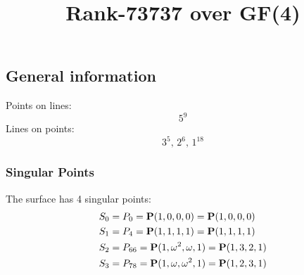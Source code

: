 \documentclass{article}
\newcommand\setTBstruts{\def\T{\rule{0pt}{2.6ex}}%
\def\B{\rule[-1.2ex]{0pt}{0pt}}}
\newcommand{\bP}{{\bf P}}
\begin{document}
 
\setTBstruts



{\allowdisplaybreaks%






\title{Rank-73737 over GF(4)}
\author{}%
\maketitle%
%
{}



\subsection*{General information}
Points on lines:
$$
5^9$$
Lines on points:
$$
3^5,\,2^6,\,1^{18}$$
\subsubsection*{Singular Points}
The surface has 4 singular points:\\
\begin{align*}
S_{0} &= P_{0}=\bP(1, 0, 0, 0) = \bP(1, 0, 0, 0)\\
S_{1} &= P_{4}=\bP(1, 1, 1, 1) = \bP(1, 1, 1, 1)\\
S_{2} &= P_{66}=\bP(1, \omega^{2}, \omega , 1) = \bP(1, 3, 2, 1)\\
S_{3} &= P_{78}=\bP(1, \omega , \omega^{2}, 1) = \bP(1, 2, 3, 1)\\
\end{align*}
}
\end{document}
